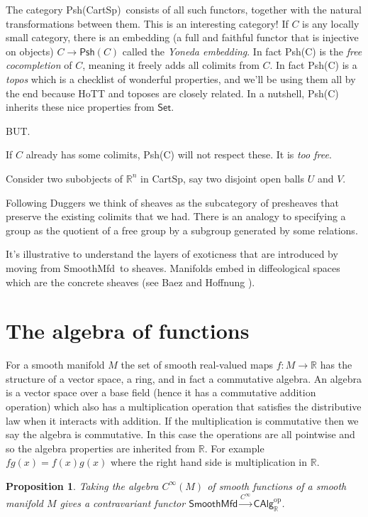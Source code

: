 \documentclass[12pt]{article}
\newcommand{\rr}{\ensuremath{\mathbb{R}}}
\newcommand{\cinfty}{\ensuremath{C^{\infty}}}
\newcommand{\smfd}{\textsf{SmoothMfd}}
\newcommand{\calg}{\textsf{CAlg}_{\rr}}
\newcommand{\cart}{\textsf{CartSp}}
\newcommand{\psh}[1]{\textsf{Psh}(#1)}
\newcommand{\pshcart}{\psh{\cart}}
\newcommand{\gc}[1]{\marginpar{\bf $\leftarrow$ {#1}}}
\newtheorem{myprop}{Proposition}
\begin{document}
The category \pshcart\ consists of all such functors, together with the natural transformations between them. This is an interesting category! If $C$ is any locally small category, there is an embedding (a full and faithful functor that is injective on objects) $C\to\psh{C}$ called the \emph{Yoneda embedding}. In fact \psh{C} is the \emph{free cocompletion} of $C$, meaning it freely adds all colimits from $C$. In fact \psh{C} is a \emph{topos} which is a checklist of wonderful properties, and we'll be using them all by the end because HoTT and toposes are closely related. In a nutshell, \psh{C} inherits these nice properties from $\mathsf{Set}$.

BUT.

If $C$ already has some colimits, \psh{C} will not respect these. It is \emph{too free}.

Consider two subobjects of $\rr^n$ in \cart, say two disjoint open balls $U$ and $V$. \gc{complete the example}

Following Duggers we think of sheaves as the subcategory of presheaves that preserve the existing colimits that we had. There is an analogy to specifying a group as the quotient of a free group by a subgroup generated by some relations.

It's illustrative to understand the layers of exoticness that are introduced by moving from \smfd\ to sheaves. Manifolds embed in diffeological spaces which are the concrete sheaves (see Baez and Hoffnung \cite{baez_convenient_2008}).\gc{give these subcategories}

\section{The algebra of functions}\label{sec:algebras}

For a smooth manifold $M$ the set of smooth real-valued maps $f:M\to\rr$ has the structure of a vector space, a ring, and in fact a commutative algebra. An algebra is a vector space over a base field (hence it has a commutative addition operation) which also has a multiplication operation that satisfies the distributive law when it interacts with addition. If the multiplication is commutative then we say the algebra is commutative. In this case the operations are all pointwise and so the algebra properties are inherited from \rr. For example $fg(x)=f(x)g(x)$ where the right hand side is multiplication in \rr.

\begin{myprop}\label{prop:algebrafunctor} Taking the algebra $\cinfty(M)$ of smooth functions of a smooth manifold $M$ gives a contravariant functor $\smfd\xrightarrow[]{\cinfty}\calg^{\mathrm{op}}$.
\end{myprop}
\end{document}
